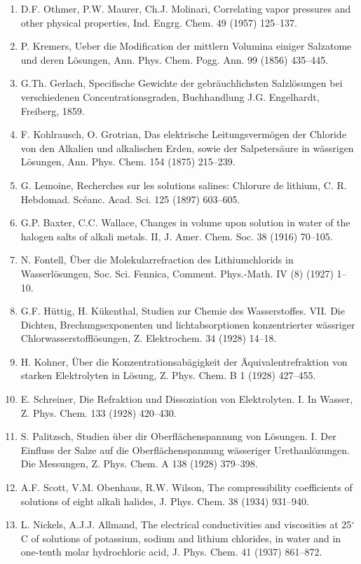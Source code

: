 \documentclass[11pt]{article}
\begin{document}
\begin{enumerate}
\item D.F. Othmer, P.W. Maurer, Ch.J. Molinari, Correlating vapor pressures and other physical properties, Ind. Engrg. Chem. 49 (1957) 125--137.
\item P. Kremers, Ueber die Modification der mittlern Volumina einiger Salzatome und deren L\"osungen, Ann. Phys. Chem. Pogg. Ann. 99 (1856) 435--445.
\item G.Th. Gerlach, Specifische Gewichte der gebr\"auchlichsten Salzl\"osungen bei verschiedenen Concentrationsgraden, Buchhandlung J.G. Engelhardt, Freiberg, 1859.
\item F. Kohlrausch, O. Grotrian, Das elektrische Leitungsverm\"ogen der Chloride von den Alkalien und alkalischen Erden, sowie der Salpeters\"aure in w\"assrigen L\"osungen, Ann. Phys. Chem. 154 (1875) 215--239.
\item G. Lemoine, Recherches sur les solutions salines: Chlorure de lithium, C. R. Hebdomad. Sc\'eanc. Acad. Sci. 125 (1897) 603--605.
\item G.P. Baxter, C.C. Wallace, Changes in volume upon solution in water of the halogen salts of alkali metals. II, J. Amer. Chem. Soc. 38 (1916) 70--105.
\item N. Fontell, \"Uber die Molekularrefraction des Lithiumchlorids in Wasserl\"osungen, Soc. Sci. Fennica, Comment. Phys.-Math. IV (8) (1927) 1--10.
\item G.F. H\"uttig, H. K\"ukenthal, Studien zur Chemie des Wasserstoffes. VII. Die Dichten, Brechungsexponenten und lichtabsorptionen konzentrierter w\"assriger Chlorwasserstofflösungen, Z. Elektrochem. 34 (1928) 14--18.
\item H. Kohner, \"Uber die Konzentrationsab\"agigkeit der \"Aquivalentrefraktion von starken Elektrolyten in L\"osung, Z. Phys. Chem. B 1 (1928) 427--455.
\item E. Schreiner, Die Refraktion und Dissoziation von Elektrolyten. I. In Wasser, Z. Phys. Chem. 133 (1928) 420--430.
\item S. Palitzsch, Studien \"uber dir Oberfl\"achenspannung von L\"osungen. I. Der Einfluss der Salze auf die Oberfl\"achenspannung w\"asseriger Urethanl\"ozungen. Die Messungen, Z. Phys. Chem. A 138 (1928) 379--398.
\item A.F. Scott, V.M. Obenhaus, R.W. Wilson, The compressibility coefficients of solutions of eight alkali halides, J. Phys. Chem. 38 (1934) 931--940.
\item L. Nickels, A.J.J. Allmand, The electrical conductivities and viscosities at 25$^\circ$C of solutions of potassium, sodium and lithium chlorides, in water and in one-tenth molar hydrochloric acid, J. Phys. Chem. 41 (1937) 861--872.

\end{enumerate}
\end{document}
